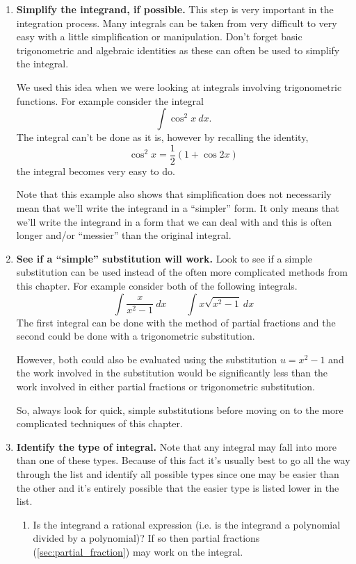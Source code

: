 \begin{enumerate}
\item \textbf{Simplify the integrand, if possible.} This step is very important in the integration process. Many integrals can be taken from very difficult to very easy with a little simplification or manipulation. Don't forget basic trigonometric and algebraic identities as these can often be used to simplify the integral.

We used this idea when we were looking at integrals involving trigonometric functions. For example consider the integral
\[\int \cos^2 x\ dx.\]
The integral can't be done as it is, however by recalling the identity,
\[\cos^2 x = \frac{1}{2}(1 + \cos 2x)\]
the integral becomes very easy to do.

Note that this example also shows that simplification does not necessarily mean that we'll write the integrand in a ``simpler'' form. It only means that we'll write the integrand in a form that we can deal with and this is often longer and/or ``messier'' than the original integral.

\item \textbf{See if a ``simple'' substitution will work.} Look to see if a simple substitution can be used instead of the often more complicated methods from this chapter. For example consider both of the following integrals.
\[\int \frac{x}{x^2-1}\ dx \qquad \int x\sqrt{x^2 -1}\ dx\]
The first integral can be done with the method of partial fractions and the second could be done with a trigonometric substitution.

However, both could also be evaluated using the substitution $u=x^2 -1$ and the work involved in the substitution would be significantly less than the work involved in either partial fractions or trigonometric substitution.

So, always look for quick, simple substitutions before moving on to the more complicated techniques of this chapter.

\item \textbf{Identify the type of integral.} Note that any integral may fall into more than 
one of these types. Because of this fact it's usually best to go all the way through the list and identify all possible types since one may be easier than the other and it's entirely possible that the easier type is listed lower in the list.

\begin{enumerate}%
\item Is the integrand a rational expression (i.e. is the integrand a polynomial divided by a polynomial)? If so then partial fractions (\autoref{sec:partial_fraction}) may work on the integral.


\end{enumerate}
\end{enumerate}
